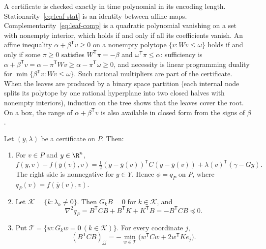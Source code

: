 A certificate is checked exactly in time polynomial in its encoding length.
Stationarity~\eqref{eq:leaf-stat} is an identity between affine maps.
Complementarity~\eqref{eq:leaf-comp} is a quadratic polynomial vanishing on a
set with nonempty interior, which holds if and only if all its coefficients
vanish. An affine inequality $\alpha+\beta^{\mathsf T}v\ge0$ on a nonempty
polytope $\{v:Wv\le\omega\}$ holds if and only if some $\pi\ge0$ satisfies
$W^{\mathsf T}\pi=-\beta$ and $\omega^{\mathsf T}\pi\le\alpha$: sufficiency is
$\alpha+\beta^{\mathsf T}v=\alpha-\pi^{\mathsf T}Wv\ge\alpha-\pi^{\mathsf T}\omega\ge0$,
and necessity is linear programming duality for
$\min\{\beta^{\mathsf T}v:Wv\le\omega\}$. Such rational multipliers are part of
the certificate. When the leaves are produced by a binary space partition
(each internal node splits its polytope by one rational hyperplane into two
closed halves with nonempty interiors), induction on the tree shows that the
leaves cover the root. On a box, the range of $\alpha+\beta^{\mathsf T}v$ is
also available in closed form from the signs of $\beta$.

\begin{lemma}\label{lem:leaf}
Let $(\bar y,\lambda)$ be a certificate on $P$. Then:
\begin{enumerate}
\item[(a)] For $v\in P$ and $y\in\R^{n}$,
\begin{equation}\label{eq:kkt-identity}
f(y,v)-f(\bar y(v),v)=\tfrac12(y-\bar y(v))^{\mathsf T}C(y-\bar y(v))
+\lambda(v)^{\mathsf T}(\gamma-Gy).
\end{equation}
The right side is nonnegative for $y\in Y$. Hence $\phi=q_P$ on $P$, where
$q_P(v)=f(\bar y(v),v)$.
\item[(b)] Let $\mathcal K=\{k:\lambda_k\not\equiv0\}$. Then $G_kB=0$ for
$k\in\mathcal K$, and
\[
\nabla^2q_P=B^{\mathsf T}CB+B^{\mathsf T}K+K^{\mathsf T}B=-B^{\mathsf T}CB\preceq0.
\]
\item[(c)] Put $\mathcal T=\{w:G_kw=0\ (k\in\mathcal K)\}$. For every
coordinate $j$,
\begin{equation}\label{eq:energy}
(B^{\mathsf T}CB)_{jj}
=-\min_{w\in\mathcal T}\bigl(w^{\mathsf T}Cw+2w^{\mathsf T}Ke_j\bigr).
\end{equation}
\end{enumerate}
\end{lemma}

